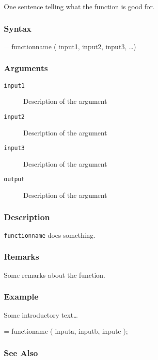 \documentclass[a4paper]{refrep}
\begin{document}
One sentence telling what the function is good for.


\subsubsection{Syntax}

\begin{example}
[ output ] = functionname ( input1, input2, input3, \ldots ) 
\end{example}


\subsubsection{Arguments}

\begin{description}
  \item[\texttt{input1}] Description of the argument 
  \item[\texttt{input2}] Description of the argument 
  \item[\texttt{input3}] Description of the argument 
  \item[\texttt{output}] Description of the argument 
\end{description}


\subsubsection{Description}

\texttt{functionname} does something.


\subsubsection{Remarks}

Some remarks about the function.


\subsubsection{Example}

Some introductory text\ldots

\begin{example}
  [ output ] = functioname ( inputa, inputb, inputc ); 
\end{example}


\subsubsection{See Also}
\end{document}
